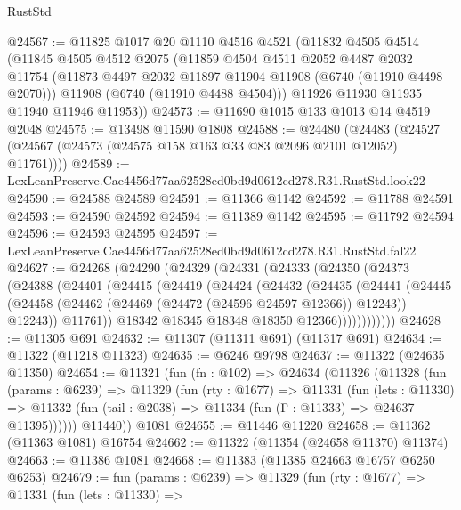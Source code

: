 \begin{lexlean}{RustStd}
\begin{coremodule}
@24567 := @11825
    @1017
    @20
    @1110
    @4516
    @4521
    (@11832
      @4505
      @4514
      (@11845
        @4505
        @4512
        @2075
        (@11859
          @4504
          @4511
          @2052
          @4487
          @2032
          @11754
          (@11873 @4497 @2032 @11897 @11904 @11908 (@6740 (@11910 @4498 @2070)))
          @11908
          (@6740 (@11910 @4488 @4504)))
        @11926
        @11930
        @11935
        @11940
        @11946
        @11953))
@24573 := @11690 @1015 @133 @1013 @14 @4519 @2048
@24575 := @13498 @11590 @1808
@24588 := @24480
    (@24483 (@24527 (@24567 (@24573 (@24575 @158 @163 @33 @83 @2096 @2101 @12052) @11761))))
@24589 := LexLeanPreserve.Cae4456d77aa62528ed0bd9d0612cd278.R31.RustStd.look22
@24590 := @24588 @24589
@24591 := @11366 @1142
@24592 := @11788 @24591
@24593 := @24590 @24592
@24594 := @11389 @1142
@24595 := @11792 @24594
@24596 := @24593 @24595
@24597 := LexLeanPreserve.Cae4456d77aa62528ed0bd9d0612cd278.R31.RustStd.fal22
@24627 := @24268
    (@24290
      (@24329
        (@24331
          (@24333
            (@24350
              (@24373
                (@24388
                  (@24401
                    (@24415
                      (@24419
                        (@24424
                          (@24432
                            (@24435
                              (@24441
                                (@24445
                                  (@24458
                                    (@24462 (@24469 (@24472 (@24596 @24597 @12366)) @12243))
                                    @12243))
                                @11761))
                            @18342
                            @18345
                            @18348
                            @18350
                            @12366))))))))))))
@24628 := @11305 @691
@24632 := @11307 (@11311 @691) (@11317 @691)
@24634 := @11322 (@11218 @11323)
@24635 := @6246 @9798
@24637 := @11322 (@24635 @11350)
@24654 := @11321
    (fun (fn : @102) =>
    @24634
      (@11326
        (@11328
          (fun (params : @6239) =>
          @11329
            (fun (rty : @1677) =>
            @11331
              (fun (lets : @11330) =>
              @11332 (fun (tail : @2038) => @11334 (fun (Γ : @11333) => @24637 @11395))))))
        @11440))
    @1081
@24655 := @11446 @11220
@24658 := @11362 (@11363 @1081) @16754
@24662 := @11322 (@11354 (@24658 @11370) @11374)
@24663 := @11386 @1081
@24668 := @11383 (@11385 @24663 @16757 @6250 @6253)
@24679 := fun (params : @6239) =>
  @11329
    (fun (rty : @1677) =>
    @11331
      (fun (lets : @11330) =>

\end{coremodule}
\end{lexlean}
